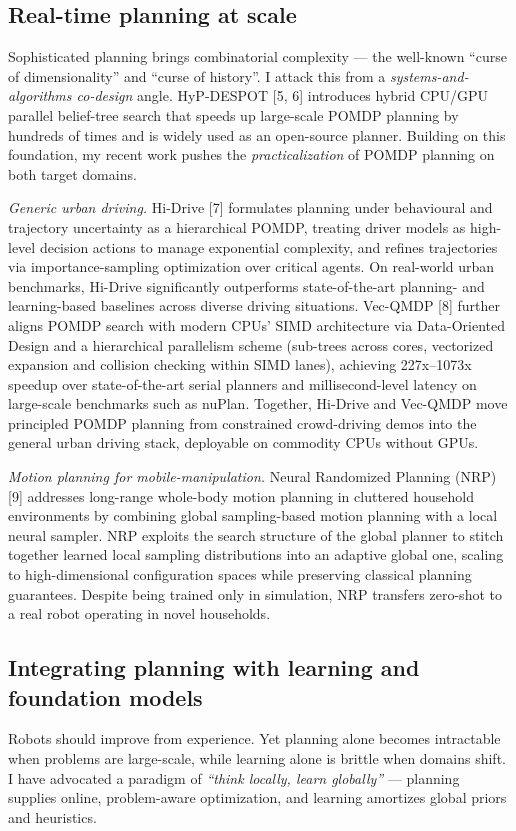 \documentclass{article}
\begin{document}
\subsection*{Real-time planning at scale}
Sophisticated planning brings combinatorial complexity --- the well-known ``curse of dimensionality'' and ``curse of history''. I attack this from a \emph{systems-and-algorithms co-design} angle. HyP-DESPOT [5, 6] introduces hybrid CPU/GPU parallel belief-tree search that speeds up large-scale POMDP planning by hundreds of times and is widely used as an open-source planner. Building on this foundation, my recent work pushes the \emph{practicalization} of POMDP planning on both target domains.

\textit{Generic urban driving.} Hi-Drive [7] formulates planning under behavioural and trajectory uncertainty as a hierarchical POMDP, treating driver models as high-level decision actions to manage exponential complexity, and refines trajectories via importance-sampling optimization over critical agents. On real-world urban benchmarks, Hi-Drive significantly outperforms state-of-the-art planning- and learning-based baselines across diverse driving situations. Vec-QMDP [8] further aligns POMDP search with modern CPUs' SIMD architecture via Data-Oriented Design and a hierarchical parallelism scheme (sub-trees across cores, vectorized expansion and collision checking within SIMD lanes), achieving 227x--1073x speedup over state-of-the-art serial planners and millisecond-level latency on large-scale benchmarks such as nuPlan. Together, Hi-Drive and Vec-QMDP move principled POMDP planning from constrained crowd-driving demos into the general urban driving stack, deployable on commodity CPUs without GPUs.

\textit{Motion planning for mobile-manipulation.} Neural Randomized Planning (NRP) [9] addresses long-range whole-body motion planning in cluttered household environments by combining global sampling-based motion planning with a local neural sampler. NRP exploits the search structure of the global planner to stitch together learned local sampling distributions into an adaptive global one, scaling to high-dimensional configuration spaces while preserving classical planning guarantees. Despite being trained only in simulation, NRP transfers zero-shot to a real robot operating in novel households.

\subsection*{Integrating planning with learning and foundation models}
Robots should improve from experience. Yet planning alone becomes intractable when problems are large-scale, while learning alone is brittle when domains shift. I have advocated a paradigm of \emph{``think locally, learn globally''} --- planning supplies online, problem-aware optimization, and learning amortizes global priors and heuristics.
\end{document}
